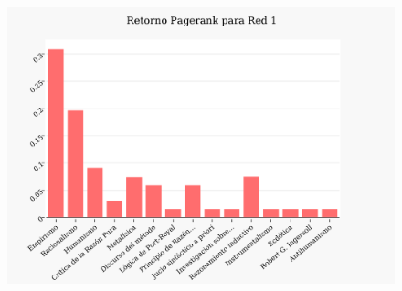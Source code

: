 \documentclass[a4paper]{article}
\begin{document}
\begin{figure}[h!]
  \begin{center}
	\includegraphics[scale=0.66]{imagenes/Exp1/PR1}
	\caption{}
	\label{PR1}
  \end{center}
\end{figure}
\end{document}
